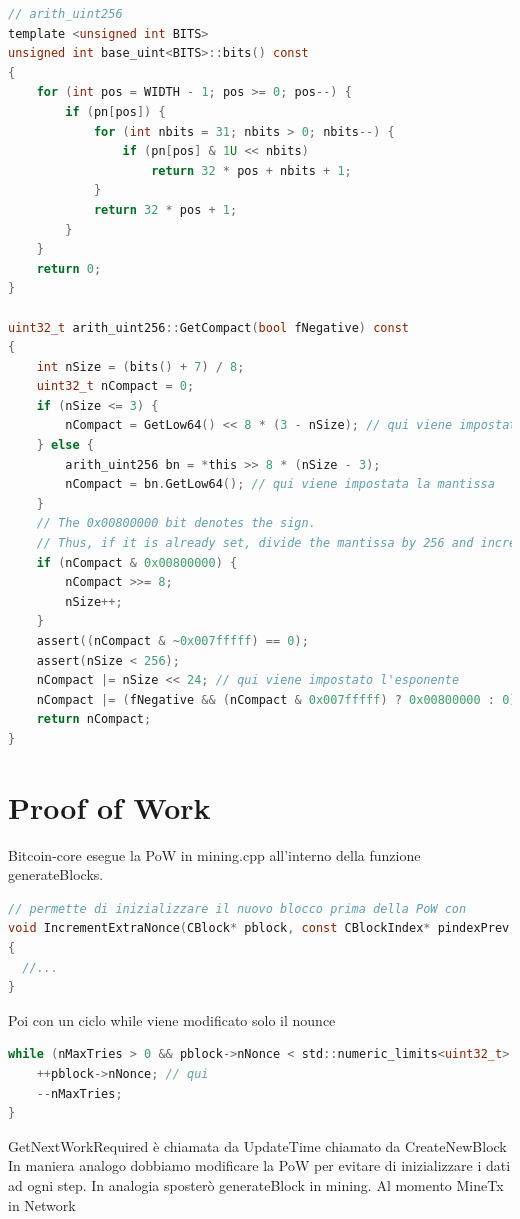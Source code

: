 \documentclass{article}
\begin{document}
\lstset{style=mystyle}
\begin{lstlisting}[language=c]
// arith_uint256
template <unsigned int BITS>
unsigned int base_uint<BITS>::bits() const
{
    for (int pos = WIDTH - 1; pos >= 0; pos--) {
        if (pn[pos]) {
            for (int nbits = 31; nbits > 0; nbits--) {
                if (pn[pos] & 1U << nbits)
                    return 32 * pos + nbits + 1;
            }
            return 32 * pos + 1;
        }
    }
    return 0;
}

uint32_t arith_uint256::GetCompact(bool fNegative) const
{
    int nSize = (bits() + 7) / 8;
    uint32_t nCompact = 0;
    if (nSize <= 3) {
        nCompact = GetLow64() << 8 * (3 - nSize); // qui viene impostata la mantissa
    } else {
        arith_uint256 bn = *this >> 8 * (nSize - 3);
        nCompact = bn.GetLow64(); // qui viene impostata la mantissa
    }
    // The 0x00800000 bit denotes the sign.
    // Thus, if it is already set, divide the mantissa by 256 and increase the exponent.
    if (nCompact & 0x00800000) {
        nCompact >>= 8;
        nSize++;
    }
    assert((nCompact & ~0x007fffff) == 0);
    assert(nSize < 256);
    nCompact |= nSize << 24; // qui viene impostato l'esponente
    nCompact |= (fNegative && (nCompact & 0x007fffff) ? 0x00800000 : 0); // qui viene impostato il segno
    return nCompact;
}
\end{lstlisting}

\section{Proof of Work}

Bitcoin-core esegue la PoW in mining.cpp all'interno della funzione generateBlocks.

\lstset{style=mystyle}
\begin{lstlisting}[language=c]
// permette di inizializzare il nuovo blocco prima della PoW con
void IncrementExtraNonce(CBlock* pblock, const CBlockIndex* pindexPrev, unsigned int& nExtraNonce)
{
  //...
}
\end{lstlisting}

Poi con un ciclo while viene modificato solo il nounce

\lstset{style=mystyle}
\begin{lstlisting}[language=c]
while (nMaxTries > 0 && pblock->nNonce < std::numeric_limits<uint32_t>::max() && !CheckProofOfWork(pblock->GetHash(), pblock->nBits, Params().GetConsensus()) && !ShutdownRequested()) {
    ++pblock->nNonce; // qui
    --nMaxTries;
}
\end{lstlisting}

GetNextWorkRequired è chiamata da UpdateTime chiamato da CreateNewBlock
In maniera analogo dobbiamo modificare la PoW per evitare di inizializzare i dati ad ogni step.
In analogia sposterò generateBlock in mining. Al momento MineTx in Network

\newpage



\end{document}
